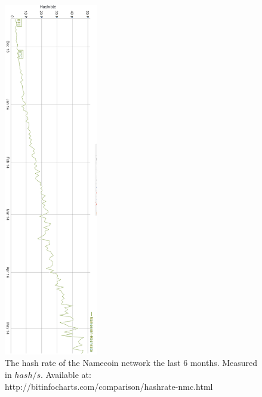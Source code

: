 \documentclass[frame, english]{idamasterthesis}
\begin{document}
\begin{figure}[h!]      %
    \centering
    \includegraphics[height = 155mm]{Pics/hashrate.png}
    \caption{The hash rate of the Namecoin network the last 6 months. Measured in $hash/s$. Available at: http://bitinfocharts.com/comparison/hashrate-nmc.html}
    \label{fig:hashrate}
\end{figure}
\end{document}
